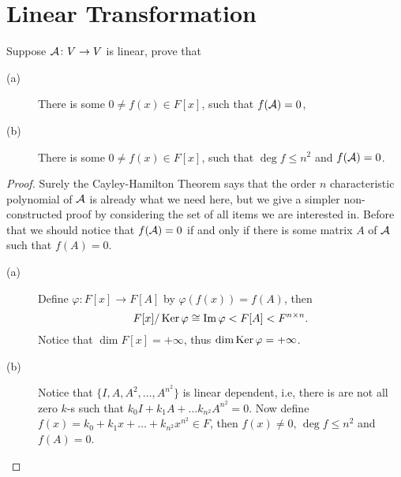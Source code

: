\section{Linear Transformation}

\begin{pro}%
	Suppose $\mathcal{A}\colon V\to V$ is linear, prove that
	\begin{description}
	\item[(a)] There is some $0\neq f(x)\in F[x]$, such that $f(\mathcal{A})=0$,
	\item[(b)] There is some $0\neq f(x)\in F[x]$, such that $\deg f\leq n^2$ and $f(\mathcal{A})=0$.
	\end{description}
\end{pro}
\begin{proof}
	Surely the Cayley-Hamilton Theorem says that the order $n$ characteristic polynomial of $\mathcal{A}$ is already what we need here, but we give a simpler non-constructed proof by considering the set of all items we are interested in. Before that we should notice that $f(\mathcal{A})=0$ if and only if there is some matrix $A$ of $\mathcal{A}$ such that $f(A)=0$.
	\begin{description}
	\item[(a)] Define $\varphi\colon F[x]\to F[A]$ by $\varphi(f(x))=f(A)$, then 
	\[F[x]/\operatorname*{Ker}\varphi\cong \operatorname*{Im}\varphi <F[A]<F^{n\times n}.\]
	Notice that $\dim F[x]=+\infty$, thus $\dim \operatorname*{Ker} \varphi=+\infty$.
	\item[(b)] Notice that $\{I,A,A^2,\dots, A^{n^2}\}$ is linear dependent, i.e, there is are not all zero $k$-s such that
	$k_0I+k_1 A+\dots k_{n^2}A^{n^2}=0$. Now define $f(x)=k_0+k_1x+\dots+k_{n^2}x^{n^2}\in F$, then $f(x)\neq 0$, $\deg f\leq n^2$ and $f(A)=0$.
	\end{description}
\end{proof}

